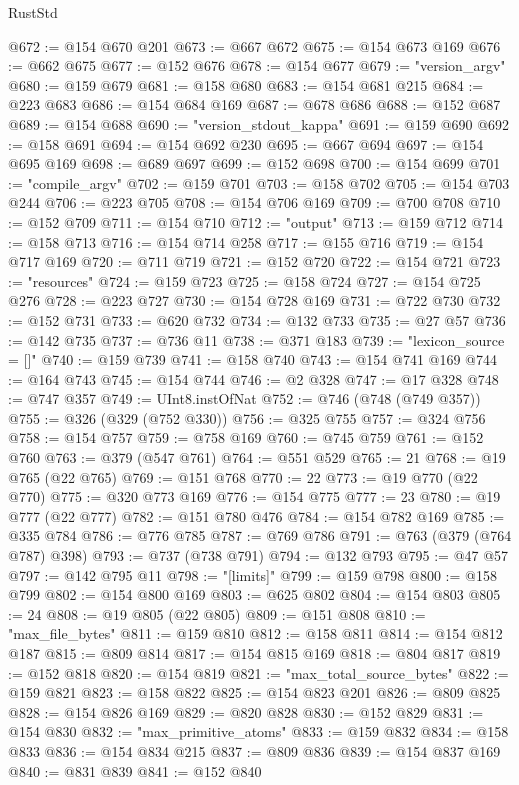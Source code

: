 \begin{lexlean}{RustStd}
\begin{coremodule}
{\begin{coremodule}
{{{{{{{{{{{{{{{{{{{{{{{{{{{{{{{{{{{{{{{{{{{{{{{{{{{{{{{{{{{{{{{{{{{{{{{{{{{{{{{{@672 := @154 @670 @201
@673 := @667 @672
@675 := @154 @673 @169
@676 := @662 @675
@677 := @152 @676
@678 := @154 @677
@679 := "version_argv"
@680 := @159 @679
@681 := @158 @680
@683 := @154 @681 @215
@684 := @223 @683
@686 := @154 @684 @169
@687 := @678 @686
@688 := @152 @687
@689 := @154 @688
@690 := "version_stdout_kappa"
@691 := @159 @690
@692 := @158 @691
@694 := @154 @692 @230
@695 := @667 @694
@697 := @154 @695 @169
@698 := @689 @697
@699 := @152 @698
@700 := @154 @699
@701 := "compile_argv"
@702 := @159 @701
@703 := @158 @702
@705 := @154 @703 @244
@706 := @223 @705
@708 := @154 @706 @169
@709 := @700 @708
@710 := @152 @709
@711 := @154 @710
@712 := "output"
@713 := @159 @712
@714 := @158 @713
@716 := @154 @714 @258
@717 := @155 @716
@719 := @154 @717 @169
@720 := @711 @719
@721 := @152 @720
@722 := @154 @721
@723 := "resources"
@724 := @159 @723
@725 := @158 @724
@727 := @154 @725 @276
@728 := @223 @727
@730 := @154 @728 @169
@731 := @722 @730
@732 := @152 @731
@733 := @620 @732
@734 := @132 @733
@735 := @27 @57
@736 := @142 @735
@737 := @736 @11
@738 := @371 @183
@739 := "lexicon_source = []"
@740 := @159 @739
@741 := @158 @740
@743 := @154 @741 @169
@744 := @164 @743
@745 := @154 @744
@746 := @2 @328
@747 := @17 @328
@748 := @747 @357
@749 := UInt8.instOfNat
@752 := @746 (@748 (@749 @357))
@755 := @326 (@329 (@752 @330))
@756 := @325 @755
@757 := @324 @756
@758 := @154 @757
@759 := @758 @169
@760 := @745 @759
@761 := @152 @760
@763 := @379 (@547 @761)
@764 := @551 @529
@765 := 21
@768 := @19 @765 (@22 @765)
@769 := @151 @768
@770 := 22
@773 := @19 @770 (@22 @770)
@775 := @320 @773 @169
@776 := @154 @775
@777 := 23
@780 := @19 @777 (@22 @777)
@782 := @151 @780 @476
@784 := @154 @782 @169
@785 := @335 @784
@786 := @776 @785
@787 := @769 @786
@791 := @763 (@379 (@764 @787) @398)
@793 := @737 (@738 @791)
@794 := @132 @793
@795 := @47 @57
@797 := @142 @795 @11
@798 := "[limits]"
@799 := @159 @798
@800 := @158 @799
@802 := @154 @800 @169
@803 := @625 @802
@804 := @154 @803
@805 := 24
@808 := @19 @805 (@22 @805)
@809 := @151 @808
@810 := "max_file_bytes"
@811 := @159 @810
@812 := @158 @811
@814 := @154 @812 @187
@815 := @809 @814
@817 := @154 @815 @169
@818 := @804 @817
@819 := @152 @818
@820 := @154 @819
@821 := "max_total_source_bytes"
@822 := @159 @821
@823 := @158 @822
@825 := @154 @823 @201
@826 := @809 @825
@828 := @154 @826 @169
@829 := @820 @828
@830 := @152 @829
@831 := @154 @830
@832 := "max_primitive_atoms"
@833 := @159 @832
@834 := @158 @833
@836 := @154 @834 @215
@837 := @809 @836
@839 := @154 @837 @169
@840 := @831 @839
@841 := @152 @840
}}}}}}}}}}}}}}}}}}}}}}}}}}}}}}}}}}}}}}}}}}}}}}}}}}}}}}}}}}}}}}}}}}}}}}}}}}}}}}}}
\end{coremodule}}
\end{coremodule}
\end{lexlean}
